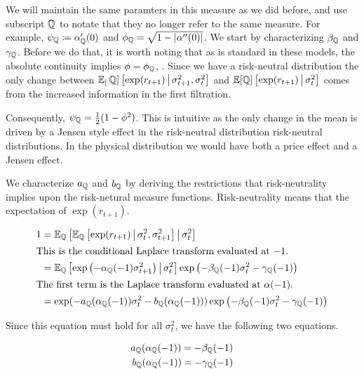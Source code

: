 \documentclass[11pt, letterpaper, twoside, final]{article}
\begin{document}
We will maintain the same paramters in this measure as we did before, and use subscript $\QQ$ to notate that they
no longer refer to the same measure.
For example, $\psi_{\QQ} \coloneqq \alpha_{\QQ}'(0)$ and $\phi_{\QQ} = \sqrt{1 - \abs*{\alpha''(0)}}$.
We start by characterizing $\beta_{\QQ}$ and $\gamma_{\QQ}$.
Before we do that, it is worth noting that as is standard in these models, the absolute continuity implies $\phi =
\phi_{\QQ}$, \parencite[17]{khrapov2016affine}.
Since we have a risk-neutral distribution the only change between $\E_[\QQ]\left[\exp(r_{t+1}) \mvert
\sigma^2_{t+1}, \sigma^2_t\right]$ and $\E[\QQ]\left[\exp(r_{t+1}) \mvert \sigma^2_t\right]$ comes from the
increased information in the first filtration.

Consequently, $\psi_{\QQ} = \frac{1}{2} (1 - \phi^2)$.
This is intuitive as the only change in the mean is driven  by  a Jensen style effect in the risk-neutral
distribution risk-neutral distributions.
In the physical distribution we would have both a price effect and a Jensen effect.

We characterize $a_{\QQ}$ and $b_{\QQ}$ by deriving the restrictions that risk-neutrality implies upon the
risk-netural measure functions.
Risk-neutrality means that the expectation of $\exp(r_{t+1})$.

\begin{align}
    1 &= \E_{\QQ}\left[\E_{\QQ}\left[\exp(r_{t+1}) \mvert \sigma_t^2, \sigma^2_{t+1}\right]  \mvert \sigma^2_t
        \right] \\
%
      \intertext{This is the conditional Laplace transform evaluated at $-1$.}
%
      \label{eqn:risk_neutral_at_neg_1}
      &= \E_{\QQ}\left[ \exp\left(-\alpha_{\QQ}(-1) \sigma^2_{t+1}\right)  \mvert \sigma^2_t \right] 
         \exp\left(-\beta_{\QQ}(-1) \sigma^2_t - \gamma_{\QQ}(-1)\right)   \\
%
      \intertext{The first term is the Laplace transform evaluated at $\alpha(-1)$.}
%
      &= \exp(-a_{\QQ}(\alpha_{\QQ}(-1)) \sigma^2_t - b_{\QQ}(\alpha_{\QQ}(-1))) \exp\left(-\beta_{\QQ}(-1)
         \sigma^2_t - \gamma_{\QQ}(-1)\right)  
\end{align}

Since this equation must hold for all $\sigma_t^2$, we have the following two equations.

\begin{align}
    a_{\QQ}(\alpha_{\QQ}(-1)) = - \beta_{\QQ}(-1) \\
    b_{\QQ}(\alpha_{\QQ}(-1)) = - \gamma_{\QQ}(-1) 
\end{align}
\end{document}
